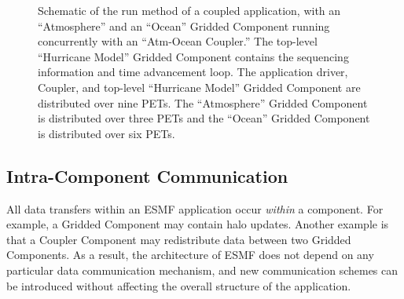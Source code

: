 \begin{center}
\begin{figure}
\caption{Schematic of the run method of a coupled application, with an
``Atmosphere'' and an ``Ocean'' Gridded Component running concurrently with 
an ``Atm-Ocean Coupler.''  The top-level ``Hurricane Model'' 
Gridded Component contains the sequencing information and time 
advancement loop.  The application driver, Coupler, and top-level ``Hurricane
Model'' Gridded Component are distributed over nine PETs.  The
``Atmosphere'' Gridded Component is distributed over three PETs and
the ``Ocean'' Gridded Component is distributed over six PETs.}
\label{fig:concurrent}
\end{figure}
\end{center}

\subsection{Intra-Component Communication}
\label{sec:localcomm}

All data transfers within an ESMF application occur {\it within} a
component.  For example, a Gridded Component may contain halo updates.
Another example is that a Coupler Component may redistribute
data between two Gridded Components.  As a result,
the architecture of ESMF does not depend on any particular data
communication mechanism, and new communication schemes can be
introduced without affecting the overall structure of the application.

